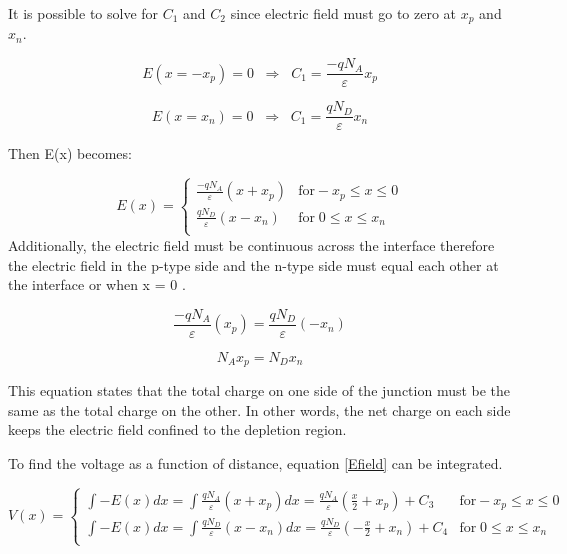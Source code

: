 \begin{doublespace}
It is possible to solve for $C_{1}$ and $C_{2}$ since electric field must go to zero at $x_{p}$ and $x_{n}$.

\begin{equation}
E(x=-x_{p})=0  \; \;  \Rightarrow  \;\; C_{1}= \frac{-qN_{A}}{\varepsilon}x_{p}
\end{equation}

\begin{equation}
E(x=x_{n})=0  \; \;  \Rightarrow  \;\; C_{1}= \frac{qN_{D}}{\varepsilon}x_{n}
\end{equation}

Then E(x) becomes:

\begin{equation}
E(x) = \begin{cases}
         \frac{-qN_{A}}{\varepsilon}(x+x_{p}) & \text{for}  -x_{p}\leq x \leq 0 \\
         \frac{qN_{D}}{\varepsilon}(x-x_{n})  &  \text{for} \; 0 \leq x \leq x_{n}  \\
     \end{cases}
\end{equation}
 Additionally, the electric field must be continuous across the interface therefore the electric field in the p-type side and the n-type side must equal each other at the interface or when x = 0 . 

\begin{equation}
\frac{-qN_{A}}{\varepsilon}(x_{p})=\frac{qN_{D}}{\varepsilon}(-x_{n})
\end{equation}

\begin{equation}
N_{A}x_{p}=N_{D}x_{n}
\label{NAeqND}
\end{equation}

This equation states that the total charge on one side of the junction must be the same as the total charge on the other. In other words, the net charge on each side keeps the electric field confined to the depletion region.

To find the voltage as a function of distance, equation \ref{Efield} can be integrated.

\begin{equation}
V(x) = \begin{cases}
       \int -E(x)dx=\int \frac{qN_{A}}{\varepsilon}(x+x_{p}) dx = \frac{qN_{A}}{\varepsilon}(\frac{x}{2}+x_{p})+ C_{3} & \text{for}  -x_{p}\leq x \leq 0 \\
       \int -E(x)dx=\int \frac{qN_{D}}{\varepsilon}(x-x_{n}) dx = \frac{qN_{D}}{\varepsilon}(-\frac{x}{2}+x_{n})+ C_{4}  &  \text{for} \; 0 \leq x \leq x_{n}  \\
     \end{cases}
\end{equation}


\end{doublespace}
